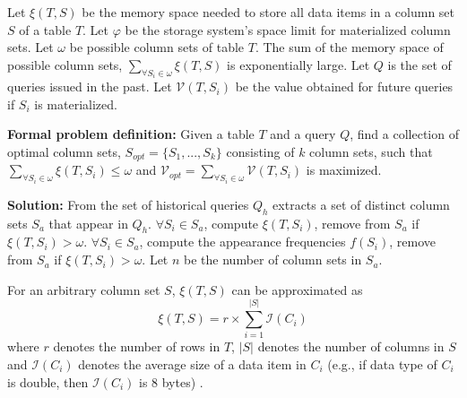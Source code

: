 \documentclass{sig-alternate-05-2015}
\begin{document}
Let $\xi(T, S)$ be the memory space needed to store all data items in a column set $S$ of a table $T$.
Let $\varphi$ be the storage system's space limit for materialized column sets.
Let $\omega$ be possible column sets of table $T$. 
The sum of the memory space of possible column sets, $\sum_{\forall S_i \in \omega} \xi(T, S)$ is exponentially large.
Let $Q$ is the set of queries issued in the past.
Let $\mathcal{V}(T, S_i)$ be the value obtained for future queries if $S_i$ is materialized.

\noindent
\textbf{Formal problem definition:}  Given a table $T$ and a query $Q$, find a collection of optimal column sets, $S_{opt} = \{S_1, ..., S_k\}$ consisting of $k$ column sets, such that $\sum_{\forall S_i \in \omega} \xi(T, S_i) \leq \omega $ and $\mathcal{V}_{opt} = \sum_{\forall S_i \in \omega} \mathcal{V}(T, S_i) $ is maximized.

\noindent
\textbf{Solution:}
From the set of historical queries $Q_h$ extracts a set of distinct column sets $S_{a}$ that appear in $Q_h$.
$\forall S_i \in S_{a}$, compute $\xi(T, S_i)$, remove from $S_{a}$ if $\xi(T, S_i) > \omega$.
$\forall S_i \in S_{a}$, compute the appearance frequencies $f(S_i)$, remove from $S_{a}$ if $\xi(T, S_i) > \omega$.
Let $n$ be the number of column sets in $S_a$.

For an arbitrary column set $S$, $\xi(T, S)$ can be approximated as
\begin{equation}
\xi(T, S) = r \times \sum_{i=1}^{|S|} \mathcal{I}(C_i)
\end{equation}
where $r$ denotes the number of rows in $T$, 
$|S|$ denotes the number of columns in $S$ 
and $\mathcal{I}(C_i)$ denotes the average size of a data item in $C_i$ 
(e.g., if data type of $C_i$ is double, then $\mathcal{I}(C_i)$ is 8 bytes) .

\end{document}
